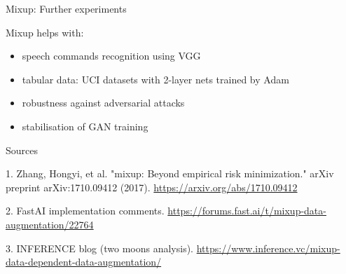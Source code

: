 \documentclass{beamer}
\begin{document}
\begin{frame}{Mixup: Further experiments}

Mixup helps with:
\begin{itemize}
\item speech commands recognition using VGG
\item tabular data: UCI datasets with 2-layer nets trained by Adam
\item robustness against adversarial attacks
\item stabilisation of GAN training
\end{itemize}

\end{frame}

\begin{frame}{Sources}
\begin{thebibliography}{0}

   1. Zhang, Hongyi, et al. "mixup: Beyond empirical risk minimization." arXiv preprint arXiv:1710.09412 (2017). \url{https://arxiv.org/abs/1710.09412}
  
   2. FastAI implementation comments. \url{https://forums.fast.ai/t/mixup-data-augmentation/22764}
  
   3. INFERENCE blog (two moons analysis). \url{https://www.inference.vc/mixup-data-dependent-data-augmentation/} 
  
\end{thebibliography}

\end{frame}

 
\end{document}
